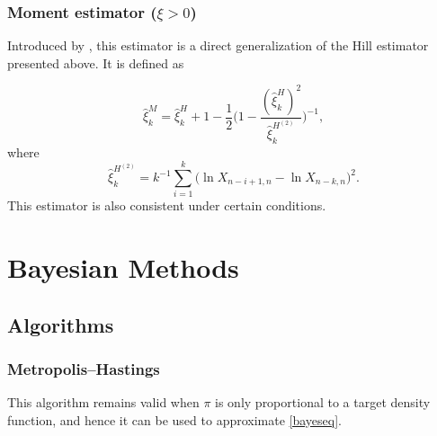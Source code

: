 \subsection*{Moment estimator ($\xi>0$)}

Introduced by \cite{dekkers_moment_1989}, this estimator is a direct generalization of the Hill estimator presented above. It is defined as

\begin{equation}
\hat{\xi}^M_k=\hat{\xi}_k^H+1-\frac{1}{2}\Bigg(1-\frac{(\hat{\xi}_k^H)^2}{\hat{\xi}^{H^{(2)}}_k }\Bigg)^{-1},
\end{equation}
where
\begin{equation*}
\hat{\xi}^{H^{(2)}}_k=k^{-1}\sum_{i=1}^k\big(\ln X_{n-i+1,n}-\ln X_{n-k,n}\big)^2.
\end{equation*}
This estimator is also consistent under certain conditions.  





\chapter{Bayesian Methods}\label{appB}

\section{Algorithms}\label{app:algo}

\subsection{Metropolis–Hastings}\label{app:mh}

This algorithm remains valid when $\pi$ is only proportional to a target density function, and hence it can be used to approximate \ref{bayeseq}. 

